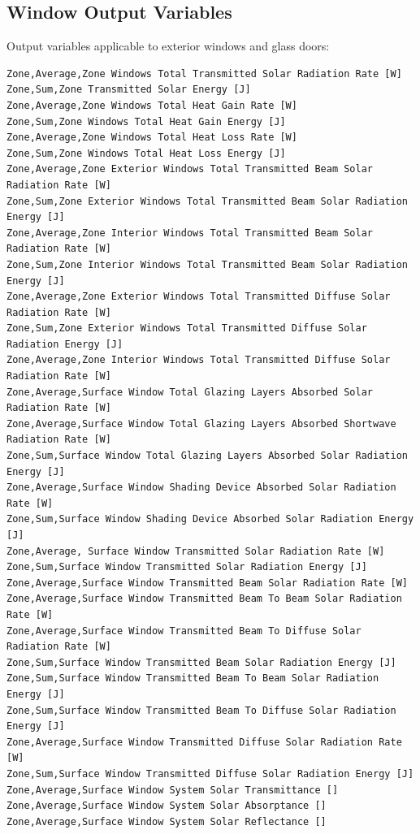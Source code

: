 \subsection{Window Output Variables}\label{window-output-variables}

Output variables applicable to exterior windows and glass doors:

\begin{lstlisting}
Zone,Average,Zone Windows Total Transmitted Solar Radiation Rate [W]
Zone,Sum,Zone Transmitted Solar Energy [J]
Zone,Average,Zone Windows Total Heat Gain Rate [W]
Zone,Sum,Zone Windows Total Heat Gain Energy [J]
Zone,Average,Zone Windows Total Heat Loss Rate [W]
Zone,Sum,Zone Windows Total Heat Loss Energy [J]
Zone,Average,Zone Exterior Windows Total Transmitted Beam Solar Radiation Rate [W]
Zone,Sum,Zone Exterior Windows Total Transmitted Beam Solar Radiation Energy [J]
Zone,Average,Zone Interior Windows Total Transmitted Beam Solar Radiation Rate [W]
Zone,Sum,Zone Interior Windows Total Transmitted Beam Solar Radiation Energy [J]
Zone,Average,Zone Exterior Windows Total Transmitted Diffuse Solar Radiation Rate [W]
Zone,Sum,Zone Exterior Windows Total Transmitted Diffuse Solar Radiation Energy [J]
Zone,Average,Zone Interior Windows Total Transmitted Diffuse Solar Radiation Rate [W]
Zone,Average,Surface Window Total Glazing Layers Absorbed Solar Radiation Rate [W]
Zone,Average,Surface Window Total Glazing Layers Absorbed Shortwave Radiation Rate [W]
Zone,Sum,Surface Window Total Glazing Layers Absorbed Solar Radiation Energy [J]
Zone,Average,Surface Window Shading Device Absorbed Solar Radiation Rate [W]
Zone,Sum,Surface Window Shading Device Absorbed Solar Radiation Energy [J]
Zone,Average, Surface Window Transmitted Solar Radiation Rate [W]
Zone,Sum,Surface Window Transmitted Solar Radiation Energy [J]
Zone,Average,Surface Window Transmitted Beam Solar Radiation Rate [W]
Zone,Average,Surface Window Transmitted Beam To Beam Solar Radiation Rate [W]
Zone,Average,Surface Window Transmitted Beam To Diffuse Solar Radiation Rate [W]
Zone,Sum,Surface Window Transmitted Beam Solar Radiation Energy [J]
Zone,Sum,Surface Window Transmitted Beam To Beam Solar Radiation Energy [J]
Zone,Sum,Surface Window Transmitted Beam To Diffuse Solar Radiation Energy [J]
Zone,Average,Surface Window Transmitted Diffuse Solar Radiation Rate [W]
Zone,Sum,Surface Window Transmitted Diffuse Solar Radiation Energy [J]
Zone,Average,Surface Window System Solar Transmittance []
Zone,Average,Surface Window System Solar Absorptance []
Zone,Average,Surface Window System Solar Reflectance []

\end{lstlisting}
